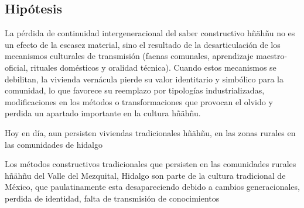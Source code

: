 \subsection{Hipótesis}

La pérdida de continuidad intergeneracional del saber constructivo hñähñu no es un efecto de la escasez material, sino el resultado de la desarticulación de los mecanismos culturales de transmisión (faenas comunales, aprendizaje maestro-oficial, rituales domésticos y oralidad técnica).  Cuando estos mecanismos se debilitan, la vivienda vernácula pierde su valor identitario y simbólico para la comunidad, lo que favorece su reemplazo por tipologías industrializadas, modificaciones en los métodos o transformaciones que provocan el olvido y perdida un apartado importante en la cultura hñähñu.

Hoy en día, aun persisten viviendas tradicionales hñähñu, en las zonas rurales en las comunidades de hidalgo

Los métodos constructivos tradicionales que persisten en las comunidades rurales hñähñu del Valle del Mezquital, Hidalgo son parte de la cultura tradicional de México, que paulatinamente esta desapareciendo debido a cambios generacionales, perdida de identidad, falta de transmisión de conocimientos
